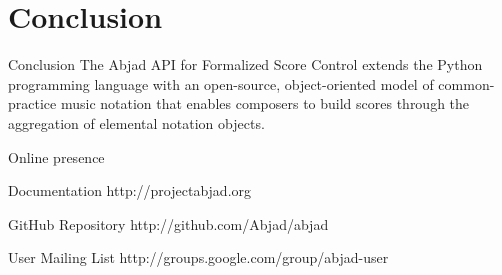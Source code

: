 \section{Conclusion}

\begin{frame}{Conclusion}
The Abjad API for Formalized Score Control extends the Python programming
language with an open-source, object-oriented model of common-practice music
notation that enables composers to build scores through the aggregation of
elemental notation objects.
\end{frame}

\begin{frame}{Online presence}
    \begin{block}{Documentation}
        http://projectabjad.org
    \end{block}
    \begin{block}{GitHub Repository}
        http://github.com/Abjad/abjad
    \end{block}
    \begin{block}{User Mailing List}
        http://groups.google.com/group/abjad-user
    \end{block}
\end{frame}

